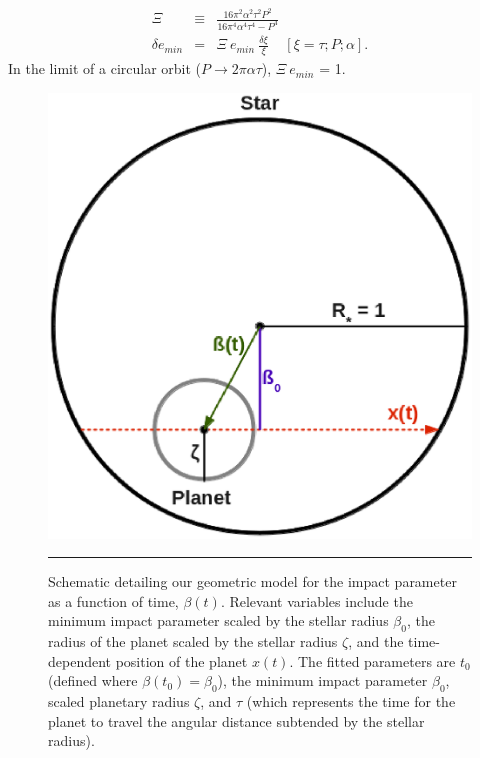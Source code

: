 \begin{eqnarray}
\Xi & \equiv & \frac{16 \pi^{2} \alpha^{2} \tau^{2} P^{2}}{16 \pi^{4} \alpha^{4} \tau^{4} - P^{4}} \\
\delta e_{min} & = & \Xi~e_{min}~\frac{\delta \xi}{\xi} ~~~~~ \left[\xi = \tau; P; \alpha \right].\nonumber
\end{eqnarray}
In the limit of a circular orbit ($P \rightarrow 2 \pi \alpha \tau$),
$\Xi~e_{min}$ = 1.

\begin{figure}[t] 
  \begin{minipage}[c]{0.37\textwidth}
    \includegraphics[width=\textwidth]{figures/schem.eps}
  \end{minipage}\hfill
  \begin{minipage}[c]{0.6\textwidth}
    \caption{Schematic detailing our geometric model for the impact
      parameter as a function of time, $\beta(t)$.  Relevant variables
      include the minimum impact parameter scaled by the stellar radius
      $\beta_0$, the radius of the planet scaled by the stellar radius
      $\zeta$, and the time-dependent position of the planet $x(t)$.  The
      fitted parameters are $t_0$ (defined where $\beta(t_0) = \beta_0$),
      the minimum impact parameter $\beta_0$, scaled planetary radius
      $\zeta$, and $\tau$ (which represents the time for the planet to
      travel the angular distance subtended by the stellar radius). }
    \label{fig-schem}
    \hspace*{\fill}  
    \hrule
  \end{minipage}
\end{figure}

